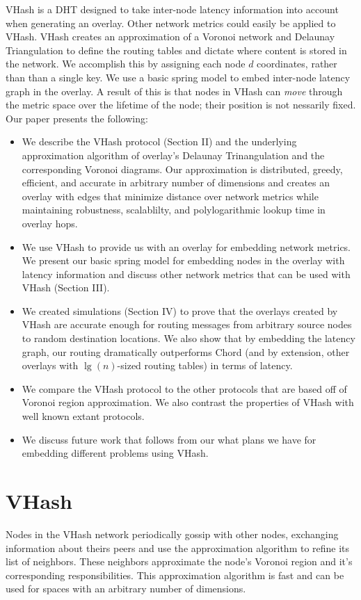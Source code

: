 \documentclass{IEEEtran}
\begin{document}
VHash is a DHT designed to take inter-node latency information into account when generating an overlay.
Other network metrics could easily be applied to VHash.
VHash creates an approximation of a Voronoi network and Delaunay Triangulation to define the routing tables and dictate where content is stored in the network.
We accomplish this by assigning each node $d$ coordinates, rather than than a single key.
We use a basic spring model to embed inter-node latency graph in the overlay.
A result of this is that nodes in VHash  can \emph{move} through the metric space over the lifetime of the node;  their position is not nessarily fixed.
Our paper presents the following:

\begin{itemize}
	\item We describe the VHash protocol (Section II) and the underlying approximation algorithm of overlay's Delaunay Trinangulation and the corresponding Voronoi diagrams.
    Our approximation is distributed, greedy, efficient, and accurate in arbitrary number of dimensions and creates an overlay with edges that minimize distance over network metrics while maintaining robustness, scalablilty, and polylogarithmic lookup time in overlay hops.
	\item We use VHash to provide us with an overlay for embedding network metrics.
    We present our basic spring model for embedding nodes in the overlay with latency information and discuss other network metrics that can be used with VHash (Section III).
	\item We created simulations (Section IV) to prove that the overlays created by VHash are accurate enough for routing messages from arbitrary source nodes to random destination locations.
    We also show that by embedding the latency graph, our routing dramatically outperforms Chord (and by extension, other overlays with $\lg(n)$-sized routing tables) in terms of latency.
	\item We compare the VHash protocol to the other protocols that are based off of Voronoi region approximation.  We also contrast the properties of VHash with well known extant protocols.
	\item We discuss future work that follows from our what plans we have for embedding different problems using VHash.
\end{itemize}


\section{VHash}
Nodes in the VHash network periodically gossip with other nodes, exchanging information about theirs peers and use the approximation algorithm to refine its list of neighbors.
These neighbors approximate the node's Voronoi region and it's corresponding responsibilities.
This approximation algorithm is fast and can be used for spaces with an arbitrary number of dimensions.
\end{document}
